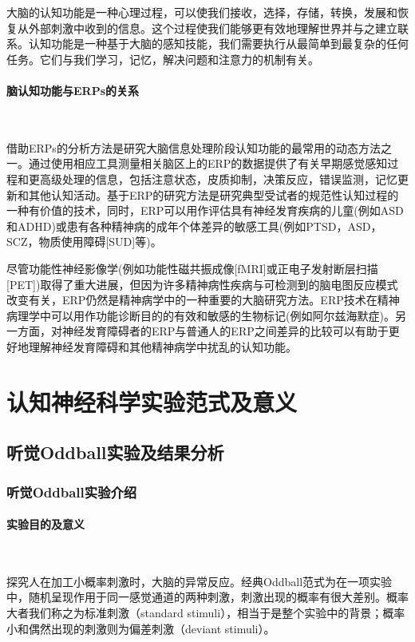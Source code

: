 \documentclass{hitreport}
\begin{document}
大脑的认知功能是一种心理过程，可以使我们接收，选择，存储，转换，发展和恢复从外部刺激中收到的信息\cite{Zhang1907}。这个过程使我们能够更有效地理解世界并与之建立联系。认知功能是一种基于大脑的感知技能，我们需要执行从最简单到最复杂的任何任务。它们与我们学习，记忆，解决问题和注意力的机制有关。

\paragraph{脑认知功能与ERPs的关系}~{}

借助ERPs的分析方法是研究大脑信息处理阶段认知功能的最常用的动态方法之一\cite{Luck2014}。通过使用相应工具测量相关脑区上的ERP的数据提供了有关早期感觉感知过程和更高级处理的信息，包括注意状态，皮质抑制，决策反应，错误监测，记忆更新和其他认知活动\cite{soc2017}。基于ERP的研究方法是研究典型受试者的规范性认知过程的一种有价值的技术，同时，ERP可以用作评估具有神经发育疾病的儿童(例如ASD和ADHD)\cite{soc2019}或患有各种精神病的成年个体差异的敏感工具(例如PTSD，ASD，SCZ，物质使用障碍[SUD]等)\cite{soc2018}\cite{Baruth2010}。

尽管功能性神经影像学(例如功能性磁共振成像[fMRI]或正电子发射断层扫描[PET])取得了重大进展，但因为许多精神病性疾病与可检测到的脑电图反应模式改变有关，ERP仍然是精神病学中的一种重要的大脑研究方法。ERP技术在精神病理学中可以用作功能诊断目的的有效和敏感的生物标记(例如阿尔兹海默症)\cite{Horvath2018}。另一方面，对神经发育障碍者的ERP与普通人的ERP之间差异的比较可以有助于更好地理解神经发育障碍和其他精神病学中扰乱的认知功能\cite{LAUZHU2019100635}。

\section{认知神经科学实验范式及意义}

\subsection{听觉Oddball实验及结果分析}

\subsubsection{听觉Oddball实验介绍}

\paragraph{实验目的及意义}~{}
 
探究人在加工小概率刺激时，大脑的异常反应。经典Oddball范式为在一项实验中，随机呈现作用于同一感觉通道的两种刺激，刺激出现的概率有很大差别。概率大者我们称之为标准刺激（standard stimuli），相当于是整个实验中的背景；概率小和偶然出现的刺激则为偏差刺激（deviant stimuli）。
\end{document}
